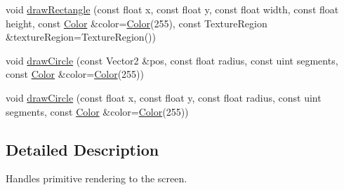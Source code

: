 \begin{DoxyCompactItemize}
\item 
void \hyperlink{class_graphics_context_a0dd520b437660a440b71748ba8d0b78c}{draw\+Rectangle} (const float x, const float y, const float width, const float height, const \hyperlink{struct_color}{Color} \&color=\hyperlink{struct_color}{Color}(255), const Texture\+Region \&texture\+Region=Texture\+Region())
\item 
void \hyperlink{class_graphics_context_a783d6c3c19ab3c635d648e820c9fac1e}{draw\+Circle} (const Vector2 \&pos, const float radius, const uint segments, const \hyperlink{struct_color}{Color} \&color=\hyperlink{struct_color}{Color}(255))
\item 
void \hyperlink{class_graphics_context_ab68e6d1a73de626fe08171e0571214d0}{draw\+Circle} (const float x, const float y, const float radius, const uint segments, const \hyperlink{struct_color}{Color} \&color=\hyperlink{struct_color}{Color}(255))
\end{DoxyCompactItemize}


\subsection{Detailed Description}
Handles primitive rendering to the screen. 


